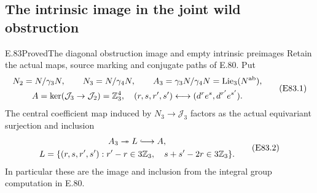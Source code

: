 \subsection{The intrinsic image in the joint wild obstruction}

\begin{statement}{E.83}{Proved}{The diagonal obstruction image and empty intrinsic preimages}
Retain the actual maps, source marking and
conjugate paths of E.80. Put
\[
 \begin{gathered}
 N_2=N/\gamma_3N,\qquad N_3=N/\gamma_4N,\qquad
 A_3=\gamma_3N/\gamma_4N=\operatorname{Lie}_3(N^{\rm ab}),\\
 A=\ker(\mathcal J_3\to\mathcal J_2)
       =\mathbb Z_3^4,
       \quad (r,s,r',s')\longleftrightarrow
                     (d^re^s,d^{r'}e^{s'}).
 \end{gathered}
 \tag{E83.1}
\]
The central coefficient map induced by
$N_3\to\mathcal J_3$ factors as the actual
equivariant surjection and inclusion
\[
 \begin{gathered}
 A_3\twoheadrightarrow L\lhook\joinrel\longrightarrow A,\\
 L=\{(r,s,r',s'):r'-r\in3\mathbb Z_3,\quad
                            s+s'-2r\in3\mathbb Z_3\}.
 \end{gathered}
 \tag{E83.2}
\]
In particular these are the image and inclusion
from the integral group computation in E.80.


\end{statement}

